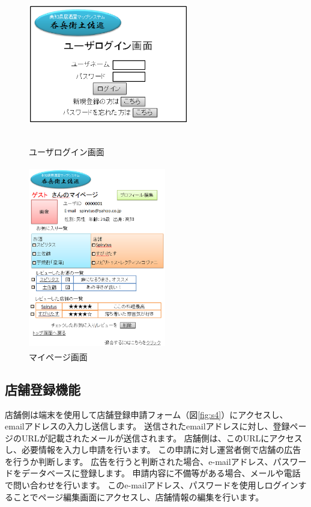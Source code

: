 \documentclass[a4j,titlepage]{jarticle}
\begin{document}
\begin{figure}[htbp]
  \begin{center}
  \includegraphics [height=7cm, width=7cm]{extrnal1_design_document_image/s2.eps}
  \caption{ユーザログイン画面}
  \label {fig:s2}
  \end{center}
\end{figure}

\begin{figure}[htbp]
  \begin{center}
  \includegraphics [height=8cm, width=6cm]{extrnal1_design_document_image/s3.eps}
  \caption{マイページ画面}
  \label {fig:s3}
  \end{center}
\end{figure}

\newpage
\subsection{店舗登録機能}
店舗側は端末を使用して店舗登録申請フォーム（図\ref{fig:s4}）にアクセスし、emailアドレスの入力し送信します。
送信されたemailアドレスに対し、登録ページのURLが記載されたメールが送信されます。
店舗側は、このURLにアクセスし、必要情報を入力し申請を行います。
この申請に対し運営者側で店舗の広告を行うか判断します。
広告を行うと判断された場合、e-mailアドレス、パスワードをデータベースに登録します。
申請内容に不備等がある場合、メールや電話で問い合わせを行います。
このe-mailアドレス、パスワードを使用しログインすることでページ編集画面にアクセスし、店舗情報の編集を行います。
\end{document}
